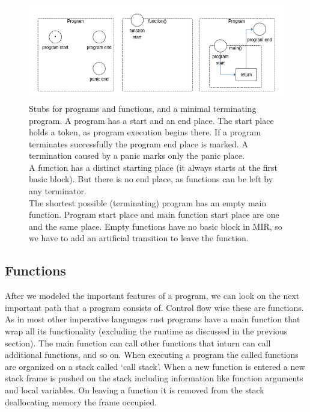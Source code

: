 \begin{figure}
    \centering
    \includegraphics[width=.9\textwidth]{../diagrams/basic_program.png}
    \caption{
        Stubs for programs and functions, and a minimal terminating program.
        A program has a start and an end place.
        The start place holds a token, as program execution begins there.
        If a program terminates successfully the program end place is marked.
        A termination caused by a panic marks only the panic place.\\
        A function has a distinct starting place (it always starts at the first basic block).
        But there is no end place, as functions can be left by any terminator.\\
        The shortest possible (terminating) program has an empty main function.
        Program start place and main function start place are one and the same place.
        Empty functions have no basic block in MIR, so we have to add an artificial transition to leave the function.
    }
    \label{program_blocks_trans}
\end{figure}

\subsection{Functions}
After we modeled the important features of a program, we can look on the next important path that a program consists of.
Control flow wise these are functions.
As in most other imperative languages rust programs have a main function that wrap all its functionality (excluding the runtime as discussed in the previous section).
The main function can call other functions that inturn can call additional functions, and so on.
When executing a program the called functions are organized on a stack called `call stack'.
When a new function is entered a new stack frame is pushed on the stack including information like function arguments and local variables.
On leaving a function it is removed from the stack deallocating memory the frame occupied.

